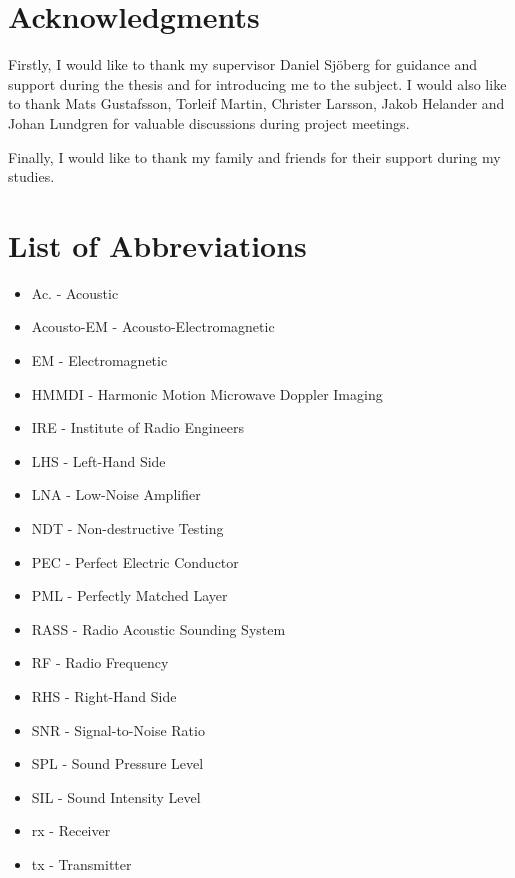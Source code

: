 \documentclass[11pt,twoside]{eitExjobb}
\begin{document}
	\chapter*{Acknowledgments}
	Firstly, I would like to thank my supervisor Daniel Sjöberg for guidance and support during the thesis and for introducing me to the subject. I would also like to thank Mats Gustafsson, Torleif Martin, Christer Larsson, Jakob Helander and Johan Lundgren for valuable discussions during project meetings. 
	
	Finally, I would like to thank my family and friends for their support during my studies.
	
	\tableofcontents
	\chapter*{List of Abbreviations}
	\begin{itemize}
		\item Ac. - Acoustic
		\item Acousto-EM - Acousto-Electromagnetic
		\item EM - Electromagnetic
		\item HMMDI - Harmonic Motion Microwave Doppler Imaging
		\item IRE - Institute of Radio Engineers
		\item LHS - Left-Hand Side
		\item LNA - Low-Noise Amplifier
		\item NDT - Non-destructive Testing
		\item PEC - Perfect Electric Conductor
		\item PML - Perfectly Matched Layer
		\item RASS - Radio Acoustic Sounding System
		\item RF - Radio Frequency
		\item RHS - Right-Hand Side
		\item SNR - Signal-to-Noise Ratio
		\item SPL - Sound Pressure Level
		\item SIL - Sound Intensity Level
		\item rx - Receiver
		\item tx - Transmitter
	\end{itemize}
	
\end{document}
